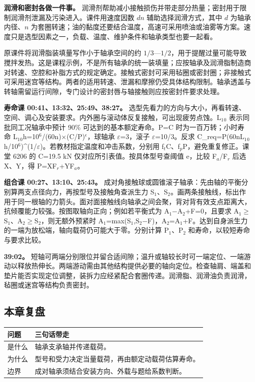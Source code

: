 \documentclass[zihao=5,a4paper,UTF8,fontset=fandol]{ctexart}
\begin{document}
\textbf{润滑和密封各做一件事。} 润滑剂帮助减小接触损伤并带走部分热量；密封用于限制润滑剂泄漏及污染进入。课件用速度因数 $dn$ 辅助选择润滑方式，其中 $d$ 为轴承内径、$n$ 为套圈转速；油的黏度还要结合温度，高速可采用喷油或油雾等方案。速度只是选型因素之一，负载、温度、维护条件和轴承类型也要一起看。


原课件将润滑脂装填量写作小于轴承空间的约 $1/3$—$1/2$，用于提醒过量可能导致搅拌发热。这是课程示例，不是所有轴承的统一装填量；应按轴承及润滑脂制造商对转速、空腔和补脂方式的规定确定。接触式密封可采用毡圈或密封圈；非接触式可采用迷宫等结构。两者的适用转速、泄漏和摩擦仍受具体结构限制。轴承透盖与转轴需留运行间隙，专门设计的密封唇与轴接触则应按密封件要求处理。


\textbf{寿命课 00:41、13:32、25:49、38:27。} 选型先看力的方向与大小，再看转速、空间、调心及安装要求。内外圈与滚动体反复接触，可出现疲劳点蚀。L$_{1}$$_{0}$ 表示同批同工况轴承中预计 90\% 可达到的基本额定寿命。P=C 时为一百万转；小时寿命 L$_{1}$$_{0}$h=10$^{6}$/(60n)$\times$(C/P)$^{\epsilon}$，球轴承 $\varepsilon$=3，滚子 $\varepsilon$=10/3。反求 C\_req=P(60nL$_{1}$$_{0}$h/10$^{6}$)\textasciicircum{}(1/$\varepsilon$)。若教材指定温度和冲击系数，分别用 f$_{t}$C、f$_{p}$P，避免重复修正。课堂 6206 的 C=19.5 kN 仅对应所引表值。按具体型号查阈值 e，比较 F$_{a}$/F$_{r}$ 后选 X、Y，得 P=XF$_{r}$+YF$_{a}$。


\textbf{组合课 00:27、13:10、25:43。} 成对角接触球或圆锥滚子轴承：先由轴的平衡分别算两支点径向力，再按型号及接触角查派生力 S$_{1}$、S$_{2}$。画两条接触线，标出作用于同一根轴的力箭头。面对面接触线向轴承之间会聚，背对背有效支点距离大，抗倾覆能力较强。按图取轴向正向；例如若平衡式为 A$_{1}$$-$A$_{2}$+F=0，且要求 A$_{1}$$\ge$S$_{1}$、A$_{2}$$\ge$S$_{2}$，则无额外预紧时 A$_{1}$=max(S$_{1}$,S$_{2}$$-$F)，A$_{2}$=A$_{1}$+F。达到自身派生力的一端为放松端，轴向载荷仍可能大于零。分别计算 P$_{1}$、P$_{2}$ 和寿命，以较短寿命与要求比较。


\textbf{39:02。} 短轴可两端分别限位并留合适间隙；温升或轴较长时可一端定位、一端游动以释放热伸长。两端游动需由其他结构提供必要的轴向定位。检查轴肩、端盖和垫片能否实现定位调整，装拆力应经紧配合套圈传递。润滑脂、润滑油负责润滑，毡圈或迷宫等结构负责密封。




\subsection{本章复盘}

\begin{longtable}{p{7.51cm}p{7.51cm}}
\toprule
问题 & 三句话带走 \\

\midrule
\endhead
是什么 & 轴承支承轴并传递载荷。 \\
为什么 & 型号和受力决定当量载荷，再由额定动载荷估算寿命。 \\
边界 & 成对轴承须结合安装方向、外载与题给系数判断。 \\
\bottomrule
\end{longtable}
\end{document}

